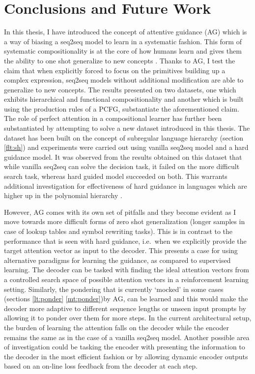 \chapter{Conclusions and Future Work} \label{Chapter:conclusion}%
In this thesis, I have introduced the concept of attentive guidance (AG) which is a way of biasing a seq2seq model to learn in a systematic fashion. This form of systematic compositionality is at the core of how humans learn \citep{marcus2003algebraic} and gives them the ability to one shot generalize to new concepts \citep{Lake2016}. Thanks to AG, I test the claim that when explicitly forced to focus on the primitives building up a complex expression, seq2seq models without additional modification are able to generalize to new concepts. The results presented on two datasets, one which exhibits hierarchical and functional compositionality and another which is built using the production rules of a PCFG, substantiate the aforementioned claim. The role of perfect attention in a compositional learner has further been substantiated by attempting to solve a new dataset introduced in this thesis. The dataset has been built on the concept of subregular language hierarchy (section \ref{flt:sh}) and experiments were carried out using vanilla seq2seq model and a hard guidance model. It was observed from the results obtained on this dataset that while vanilla seq2seq can solve the decision task, it failed on the more difficult search task, whereas hard guided model succeeded on both. This warrants additional investigation for effectiveness of hard guidance in languages which are higher up in the polynomial hierarchy \citep{arora2009computational}. 

However, AG comes with its own set of pitfalls and they become evident as I move towards more difficult forms of zero shot generalization (longer samples in case of lookup tables and symbol rewriting tasks). This is in contrast to the performance that is seen with hard guidance, i.e.\ when we explicitly provide the target attention vector as input to the decoder. This presents a case for using alternative paradigms for learning the guidance, as compared to supervised learning. The decoder can be tasked with finding the ideal attention vectors from a controlled search space of possible attention vectors in a reinforcement learning \citep{sutton2018reinforcement} setting. Similarly, the pondering that is currently \lq mocked\rq{} in some cases (sections \ref{lt:ponder} \ref{mt:ponder})by AG, can be learned and this would make the decoder more adaptive to different sequence lengths or unseen input prompts by allowing it to ponder over them for more steps. In the current architectural setup, the burden of learning the attention falls on the decoder while the encoder remains the same as in the case of a vanilla seq2seq model. Another possible area of investigation could be tasking the encoder with presenting the information to the decoder in the most efficient fashion or by allowing dynamic encoder outputs based on an on-line loss feedback from the decoder at each step. 

